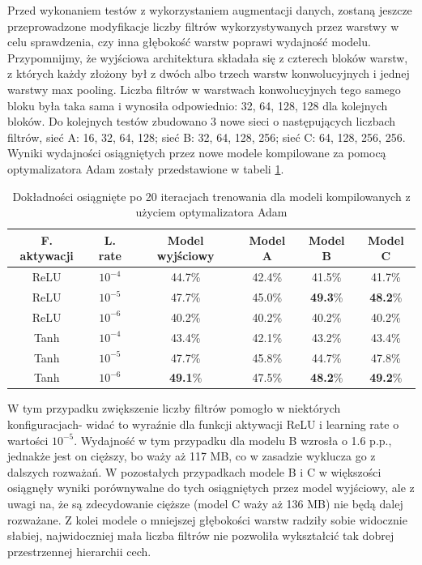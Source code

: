 Przed wykonaniem testów z wykorzystaniem augmentacji danych, zostaną jeszcze przeprowadzone modyfikacje liczby filtrów wykorzystywanych przez warstwy w celu sprawdzenia, czy inna głębokość warstw poprawi wydajność modelu. Przypomnijmy, że wyjściowa architektura składała się z czterech bloków warstw, z których każdy złożony był z dwóch albo trzech warstw konwolucyjnych i jednej warstwy max pooling. Liczba filtrów w warstwach konwolucyjnych tego samego bloku była taka sama i wynosiła odpowiednio: 32, 64, 128, 128 dla kolejnych bloków. Do kolejnych testów zbudowano 3 nowe sieci o następujących liczbach filtrów, sieć A: 16, 32, 64, 128; sieć B: 32, 64, 128, 256; sieć C: 64, 128, 256, 256. Wyniki wydajności osiągniętych przez nowe modele kompilowane za pomocą optymalizatora Adam zostały przedstawione w tabeli \ref{tab:5.6}.

\begin{table}[H]
  \centering
  \caption{Dokładności osiągnięte po 20 iteracjach trenowania dla modeli kompilowanych z użyciem optymalizatora Adam}
    \begin{tabular}{ |c|c|c|c|c|c| }
    \hline
    F. aktywacji & L. rate & Model wyjściowy & Model A & Model B & Model C \\
    \hline
    ReLU & $10^{-4}$ & 44.7\% & 42.4\% & 41.5\% & 41.7\% \\
    ReLU & $10^{-5}$ & 47.7\% & 45.0\% & \textbf{49.3}\% & \textbf{48.2}\% \\
    ReLU & $10^{-6}$ & 40.2\% & 40.2\% & 40.2\% & 40.2\% \\
    Tanh & $10^{-4}$ & 43.4\% & 42.1\% & 43.2\% & 43.4\% \\
    Tanh & $10^{-5}$ & 47.7\% & 45.8\% & 44.7\% & 47.8\% \\
    Tanh & $10^{-6}$ & \textbf{49.1}\% & 47.5\% & \textbf{48.2}\% & \textbf{49.2}\% \\
    \hline
    \end{tabular}
  \label{tab:5.6}
\end{table}

W tym przypadku zwiększenie liczby filtrów pomogło w niektórych konfiguracjach- widać to wyraźnie dla funkcji aktywacji ReLU i learning rate o wartości $10^{-5}$. Wydajność w tym przypadku dla modelu B wzrosła o 1.6 p.p., jednakże jest on cięższy, bo waży aż 117 MB, co w zasadzie wyklucza go z dalszych rozważań. W pozostałych przypadkach modele B i C w większości osiągnęły wyniki porównywalne do tych osiągniętych przez model wyjściowy, ale z uwagi na, że są zdecydowanie cięższe (model C waży aż 136 MB) nie będą dalej rozważane. Z kolei modele o mniejszej głębokości warstw radziły sobie widocznie słabiej, najwidoczniej mała liczba filtrów nie pozwoliła wykształcić tak dobrej przestrzennej hierarchii cech.


